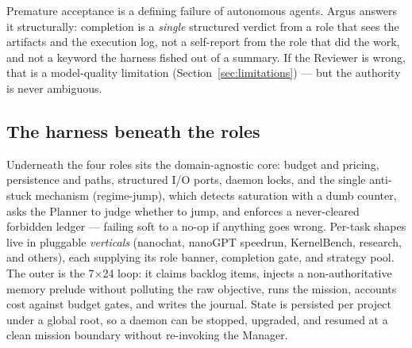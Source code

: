 \begin{callout}
Premature acceptance is a defining failure of autonomous agents. Argus answers it
structurally: completion is a \emph{single} structured verdict from a role that
sees the artifacts and the execution log, not a self-report from the role that
did the work, and not a keyword the harness fished out of a summary. If the
Reviewer is wrong, that is a model-quality limitation
(Section~\ref{sec:limitations}) --- but the authority is never ambiguous.
\end{callout}

\subsection{The harness beneath the roles}

Underneath the four roles sits the domain-agnostic core: budget and pricing,
persistence and paths, structured I/O ports, daemon locks, and the single
anti-stuck mechanism (regime-jump), which detects saturation with a dumb counter,
asks the Planner to judge whether to jump, and enforces a never-cleared forbidden
ledger --- failing soft to a no-op if anything goes wrong. Per-task shapes live in
pluggable \emph{verticals} (nanochat, nanoGPT speedrun, KernelBench, research, and
others), each supplying its role banner, completion gate, and strategy pool. The
outer  is the 7$\times$24 loop: it claims backlog items,
injects a non-authoritative memory prelude without polluting the raw objective,
runs the mission, accounts cost against budget gates, and writes the journal.
State is persisted per project under a global root, so a daemon can be stopped,
upgraded, and resumed at a clean mission boundary without re-invoking the
Manager.
